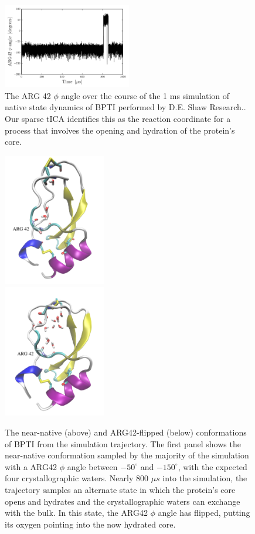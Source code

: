 \documentclass[aip, jcp, reprint, nolinenumbers, twocolumn, nobalancelastpage, nofootinbib]{revtex4-1}
\begin{document}
\begin{figure}
    \includegraphics[width=0.5\textwidth]{arg42-phi-angle.png}
    \caption{\label{fig:bpti_phi42_angle_timeseries} The ARG 42 $\phi$ angle over the course of the 1 ms simulation of native state dynamics of BPTI performed by D.E. Shaw Research.\cite{shaw2010atomic}. Our sparse tICA identifies this as the reaction coordinate for a process that involves the opening and hydration of the protein's core.}
\end{figure}

\begin{figure}
    \centering
    \includegraphics[width=0.4\textwidth]{near-native-2.pdf} \\
    \includegraphics[width=0.4\textwidth]{frame-33042-2.pdf}
    \caption{\label{fig:bpti_conformations} The near-native (above) and ARG42-flipped (below) conformations of BPTI from the simulation trajectory. The first panel shows the near-native conformation sampled by the majority of the simulation with a ARG42 $\phi$ angle between $-50^\circ$ and $-150^\circ$, with the expected four crystallographic waters. Nearly $800$ $\mu s$ into the simulation, the trajectory samples an alternate state in which the protein's core opens and hydrates and the crystallographic waters can exchange with the bulk. In this state, the ARG42 $\phi$ angle has flipped, putting its oxygen pointing into the now hydrated core.}
\end{figure}
\end{document}
